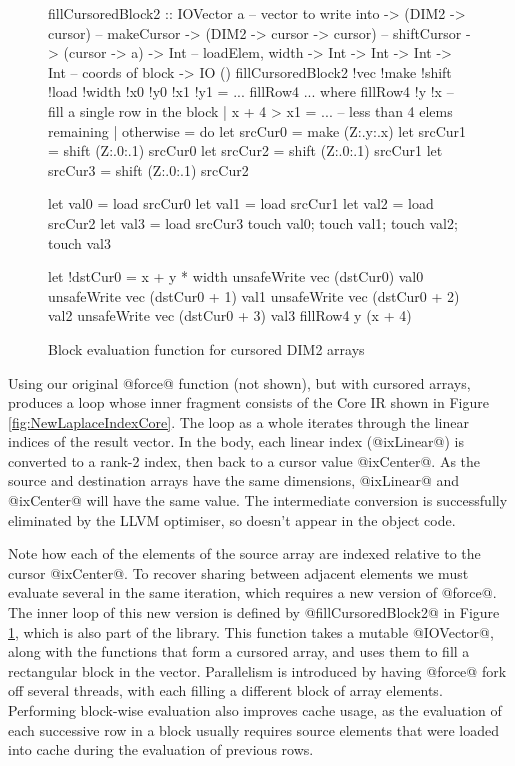 \begin{figure}
\begin{small}
\begin{code}
fillCursoredBlock2
 :: IOVector a                   -- vector to write into
 -> (DIM2   -> cursor)           -- makeCursor
 -> (DIM2   -> cursor -> cursor) -- shiftCursor
 -> (cursor -> a) -> Int         -- loadElem, width
 -> Int -> Int -> Int -> Int     -- coords of block
 -> IO ()
fillCursoredBlock2 !vec !make !shift !load
   !width !x0 !y0 !x1 !y1 = ... fillRow4 ...
 where 
    fillRow4 !y !x    -- fill a single row in the block
     | x + 4 > x1     = ... -- less than 4 elems remaining
     | otherwise
     = do let srcCur0 = make  (Z:.y:.x)
          let srcCur1 = shift (Z:.0:.1) srcCur0
          let srcCur2 = shift (Z:.0:.1) srcCur1
          let srcCur3 = shift (Z:.0:.1) srcCur2

          let val0    = load srcCur0
          let val1    = load srcCur1
          let val2    = load srcCur2
          let val3    = load srcCur3
          touch val0; touch val1; touch val2; touch val3

          let !dstCur0 = x + y * width
          unsafeWrite vec (dstCur0)     val0
          unsafeWrite vec (dstCur0 + 1) val1
          unsafeWrite vec (dstCur0 + 2) val2
          unsafeWrite vec (dstCur0 + 3) val3
          fillRow4 y (x + 4)
\end{code}	
\end{small}
\caption{Block evaluation function for cursored DIM2 arrays}
\label{fig:BlockEvaluation}
\end{figure}

Using our original @force@ function (not shown), but with cursored arrays, produces a loop whose inner fragment consists of the Core IR shown in Figure \ref{fig:NewLaplaceIndexCore}. The loop as a whole iterates through the linear indices of the result vector. In the body, each linear index (@ixLinear@) is converted to a rank-2 index, then back to a cursor value @ixCenter@. As the source and destination arrays have the same dimensions, @ixLinear@ and @ixCenter@ will have the same value. The intermediate conversion is successfully eliminated by the LLVM optimiser, so doesn't appear in the object code. 

Note how each of the elements of the source array are indexed relative to the cursor @ixCenter@. To recover sharing between adjacent elements we must evaluate several in the same iteration, which requires a new version of @force@. The inner loop of this new version is defined by @fillCursoredBlock2@ in Figure \ref{fig:BlockEvaluation}, which is also part of the library. This function takes a mutable @IOVector@, along with the functions that form a cursored array, and uses them to fill a rectangular block in the vector. Parallelism is introduced by having @force@ fork off several threads, with each filling a different block of array elements. Performing block-wise evaluation also improves cache usage, as the evaluation of each successive row in a block usually requires source elements that were loaded into cache during the evaluation of previous rows.


